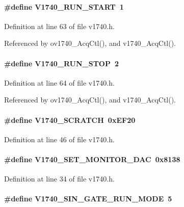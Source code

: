 \paragraph[{V1740\_\-RUN\_\-START}]{\setlength{\rightskip}{0pt plus 5cm}\#define V1740\_\-RUN\_\-START~1}\hfill\label{v1740_8h_a85236160053f86f1c73fc58c43ec7f93}


Definition at line 63 of file v1740.h.

Referenced by ov1740\_\-AcqCtl(), and v1740\_\-AcqCtl().
\paragraph[{V1740\_\-RUN\_\-STOP}]{\setlength{\rightskip}{0pt plus 5cm}\#define V1740\_\-RUN\_\-STOP~2}\hfill\label{v1740_8h_a26b7daa2378fd45f1e7c2090415a958b}


Definition at line 64 of file v1740.h.

Referenced by ov1740\_\-AcqCtl(), and v1740\_\-AcqCtl().
\paragraph[{V1740\_\-SCRATCH}]{\setlength{\rightskip}{0pt plus 5cm}\#define V1740\_\-SCRATCH~0xEF20}\hfill\label{v1740_8h_a81a71f2fcec79774ca400a89fb1cdd76}


Definition at line 46 of file v1740.h.
\paragraph[{V1740\_\-SET\_\-MONITOR\_\-DAC}]{\setlength{\rightskip}{0pt plus 5cm}\#define V1740\_\-SET\_\-MONITOR\_\-DAC~0x8138}\hfill\label{v1740_8h_a8cc678c1b677da909b144afeb125e6b9}


Definition at line 34 of file v1740.h.
\paragraph[{V1740\_\-SIN\_\-GATE\_\-RUN\_\-MODE}]{\setlength{\rightskip}{0pt plus 5cm}\#define V1740\_\-SIN\_\-GATE\_\-RUN\_\-MODE~5}\hfill\label{v1740_8h_a0f8be7ba6e6157ce2a73db6e4740d707}


